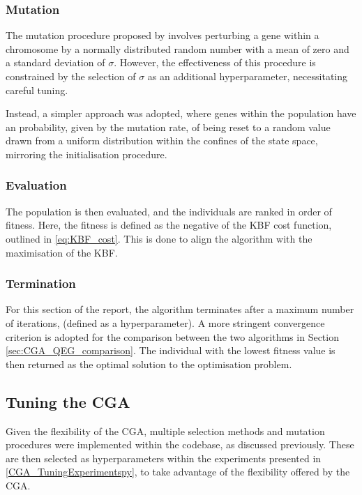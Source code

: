 \documentclass[10pt]{article}
\begin{document}
\begin{multicols}{2}
\subsubsection{Mutation}

The mutation procedure proposed by \cite{PGA} involves perturbing a gene within a chromosome by a normally distributed random number with a mean of zero and a standard deviation of $\sigma$. However, the effectiveness of this procedure is constrained by the selection of $\sigma$ as an additional hyperparameter, necessitating careful tuning. 

Instead, a simpler approach was adopted, where genes within the population have an probability, given by the mutation rate, of being reset to a random value drawn from a uniform distribution within the confines of the state space, mirroring the initialisation procedure.

\subsubsection{Evaluation}

The population is then evaluated, and the individuals are ranked in order of fitness. Here, the fitness is defined as the negative of the KBF cost function, outlined in \ref{eq:KBF_cost}. This is done to align the algorithm with the maximisation of the KBF.

\subsubsection{Termination}

For this section of the report, the algorithm terminates after a maximum number of iterations, (defined as a hyperparameter). A more stringent convergence criterion is adopted for the comparison between the two algorithms in Section \ref{sec:CGA_QEG_comparison}. The individual with the lowest fitness value is then returned as the optimal solution to the optimisation problem.

\subsection{Tuning the CGA}
\label{sec:CGA_selection_mutation}

Given the flexibility of the CGA, multiple selection methods and mutation procedures were implemented within the codebase, as discussed previously. These are then selected as hyperparameters within the experiments presented in \ref{CGA_TuningExperimentspy}, to take advantage of the flexibility offered by the CGA. 


\end{multicols}
\end{document}
